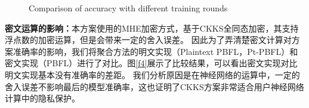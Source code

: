\begin{figure}[htb]
	\caption{Comparison of accuracy with different training rounds}
	\label{f3}
\end{figure}

\textbf{密文运算的影响：}本方案使用的MHE加密方式，基于CKKS全同态加密，其支持浮点数的加密运算，但是会带来一定的舍入误差。
因此为了弄清楚密文计算对方案准确率的影响，我们将聚合方法的明文实现（Plaintext PBFL，Pt-PBFL）和密文实现（PBFL）进行了对比。图\ref{f4}展示了比较结果，可以看出密文实现对比明文实现基本没有准确率的差距。
我们分析原因是在神经网络的运算中，一定的舍入误差不影响最后的模型准确率，这也证明了CKKS方案非常适合用户神经网络计算中的隐私保护。

